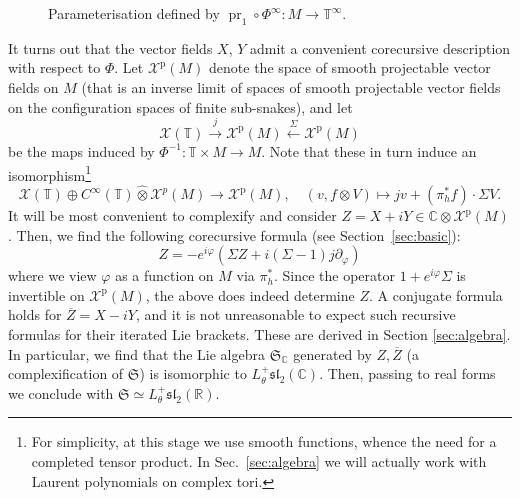 \documentclass{article}
\def\fsl{\mathfrak{sl}}
\def\fS{\mathfrak{S}}
\def\RR{\mathbb{R}}
\def\CC{\mathbb{C}}
\def\TT{\mathbb{T}}
\def\XX{\mathcal{X}}
\DeclareMathOperator{\pr}{\mathrm{pr}}
\def\p{\mathrm{p}}
\theoremstyle{definition}
\begin{document}
\begin{figure}\begin{center} %
        \end{center}
        \caption{Parameterisation defined by $\pr_1\circ\Phi^{\infty} : M \to \TT^\infty$.
        \label{fig:param}}
\end{figure}

It turns out that the vector fields $X$, $Y$ admit a convenient corecursive
description with respect to $\Phi$. Let $\XX^\p(M)$ denote the space of
smooth projectable vector fields on $M$ (that is an inverse limit of 
spaces of smooth projectable vector fields on the configuration spaces of finite sub-snakes),
and let
$$ \XX(\TT) \xrightarrow{ j} \XX^\p(M) \xleftarrow{\Sigma} \XX^\p(M) $$
be the maps induced by $\Phi^{-1} :  \TT\times M \to M$. Note that these in turn induce
an isomorphism\footnote{For simplicity, at this stage we use
smooth functions, whence the need for a completed tensor product.
In Sec.~\ref{sec:algebra} we will actually 
work with Laurent polynomials on complex tori.}
$$
\XX(\TT) \oplus C^\infty(\TT) \widehat\otimes \XX^p(M) \to \XX^\p(M),
\quad
(v, f \otimes V) \mapsto  j v + (\pi_h^* f)\cdot \Sigma V.
$$
It will be most convenient to complexify and consider
$Z = X+iY \in \CC\otimes\XX^\p(M)$.
Then, we find the following corecursive formula (see Section~\ref{sec:basic}):
$$
Z = -e^{i\varphi} \left( 
        \Sigma Z + i(\Sigma-1) j\partial_\varphi
\right)$$
where we view $\varphi$ as a function on $M$ via $\pi_h^*$.
Since the operator $1+e^{i\varphi}\Sigma$ 
is invertible on $\XX^\p(M)$, the above does indeed determine $Z$. A
conjugate formula holds for $\overline Z = X - iY$, and it is not unreasonable
to expect such recursive formulas for their iterated Lie brackets.
These are derived in Section \ref{sec:algebra}. In particular,
we find that the Lie algebra $\fS_\CC$ generated by $Z, \overline Z$
(a complexification of $\fS$) is isomorphic to $L_\theta^+\fsl_2(\CC)$.
Then, passing to real forms we conclude with $\fS\simeq L_\theta^+\fsl_2(\RR)$.
\end{document}
